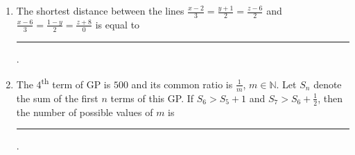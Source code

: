 \documentclass[journal,12pt,onecolumn]{IEEEtran}
\theoremstyle{remark}
\begin{document}
\begin{enumerate}
\hfill{}

\item The shortest distance between the lines $\frac{x-2}{3}=\frac{y+1}{2}=\frac{z-6}{2}$ and $\frac{x-6}{3}=\frac{1-y}{2}=\frac{z+8}{0}$ is equal to \rule{1cm}{0.15mm}.

\hfill{}

\item The $4$\textsuperscript{th} term of GP is $500$ and its common ratio is $\frac{1}{m}$, $m\in \mathbb{N}$. Let $S_n$ denote the sum of the first $n$ terms of this GP. If $S_6>S_5+1$ and $S_7>S_6+\frac{1}{2}$, then the number of possible values of $m$ is \rule{1cm}{0.15mm}.

\hfill{}

\end{enumerate}
\end{document}
